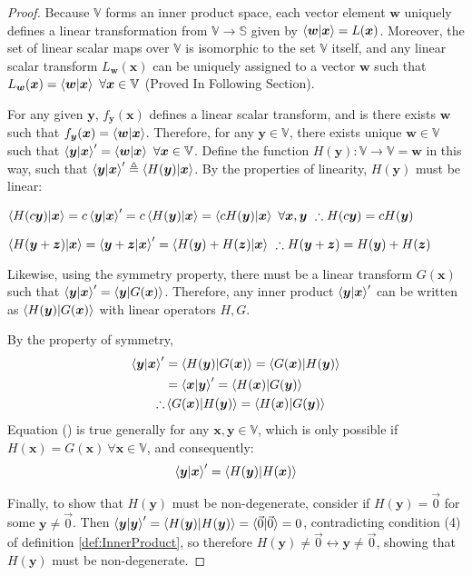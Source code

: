 \documentclass{article}
\newcommand{\B}[1]{\boldsymbol{#1}}
\theoremstyle{definition}
\theoremstyle{remark}
\begin{document}
\begin{proof}
  Because $\mathbb{V}$ forms an inner product space, each vector element $\B{w}$ uniquely defines a linear transformation
  from $\mathbb{V} \to \mathbb{S}$ given by $\braket{\B{w} | \B{x}} = L(\B{x})$. Moreover, the set of 
  linear scalar maps over $\mathbb{V}$ is isomorphic to the set $\mathbb{V}$ itself, and any linear 
  scalar transform $L_{\B{w}}(\B{x})$ can be uniquely assigned to a vector $\B{w}$ such that $L_{\B{w}}(\B{x}) = \braket{\B{w}|\B{x}} ~\forall \B{x} \in \mathbb{V}$
  (Proved In Following Section).

  For any given $\B{y}$, $f_{\B{y}}(\B{x})$ defines a linear scalar transform, and is there exists $\B{w}$ such that
  $f_{\B{y}}(\B{x}) = \braket{\B{w} | \B{x}}$. Therefore, for any $\B{y} \in \mathbb{V}$, there exists unique $\B{w} \in \mathbb{V}$ such that
  $\braket{\B{y}|\B{x}}^\prime = \braket{\B{w} | \B{x}} ~ \forall \B{x} \in \mathbb{V}$. Define the function 
  $H(\B{y}) : \mathbb{V} \to \mathbb{V} = \B{w}$ in this way, such that $\braket{\B{y}|\B{x}}^\prime \triangleq \braket{H(\B{y}) | \B{x}}$.
  By the properties of linearity, $H(\B{y})$ must be linear:

    $\braket{H(c\B{y}) | \B{x}}  =  c \braket{\B{y} |\B{x}}^\prime = c \braket{H(\B{y}) | \B{x}} =  \braket{c H(\B{y}) | \B{x}} ~ \forall \B{x}, \B{y} ~ \therefore H(c\B{y}) = c H(\B{y})$

   $\braket{H(\B{y} + \B{z}) | \B{x}} = \braket{\B{y} + \B{z} |\B{x}}^\prime =  \braket{H(\B{y}) + H(\B{z}) | \B{x}} ~ \therefore H(\B{y} + \B{z}) = H(\B{y}) + H(\B{z})$

   Likewise, using the symmetry property, there must be a linear transform $G(\B{x})$ such that 
   $\braket{\B{y}|\B{x}}^\prime = \braket{\B{y}|G(\B{x})}$. Therefore, any inner product $\braket{\B{y}|\B{x}}^\prime$
   can be written as $\braket{H(\B{y})|G(\B{x})}$ with linear operators $H, G$.

   By the property of symmetry, 
   \begin{align}
    \braket{\B{y}|\B{x}}^\prime &= \braket{H(\B{y})|G(\B{x})} = \braket{G(\B{x})|H(\B{y})} \\
    &= \braket{\B{x}|\B{y}}^\prime = \braket{H(\B{x})|G(\B{y})}  \\
    \therefore & \braket{G(\B{x})|H(\B{y})} =  \braket{H(\B{x})|G(\B{y})} \label{eq:innerProductSymmetry}
   \end{align}
   Equation () is true generally for any $\B{x}, \B{y} \in \mathbb{V}$, which is only possible if
  $H(\B{x}) = G(\B{x}) ~ \forall \B{x} \in \mathbb{V}$, and consequently:
   \begin{equation}
    \braket{\B{y}|\B{x}}^\prime = \braket{H(\B{y})|H(\B{x})}
   \end{equation}

   Finally, to show that $H(\B{y})$ must be non-degenerate, consider if $H(\B{y}) = \vec{0}$ for some $\B{y} \neq \vec{0}$. Then
   $\braket{\B{y}|\B{y}}^\prime = \braket{H(\B{y})|H(\B{y})} = \braket{\vec{0}|\vec{0}} = 0$, contradicting condition 
   (4) of definition \ref{def:InnerProduct}, so therefore $H(\B{y}) \neq \vec{0} \leftrightarrow \B{y} \neq \vec{0}$, 
   showing that $H(\B{y})$ must be non-degenerate.
\end{proof}
\end{document}
